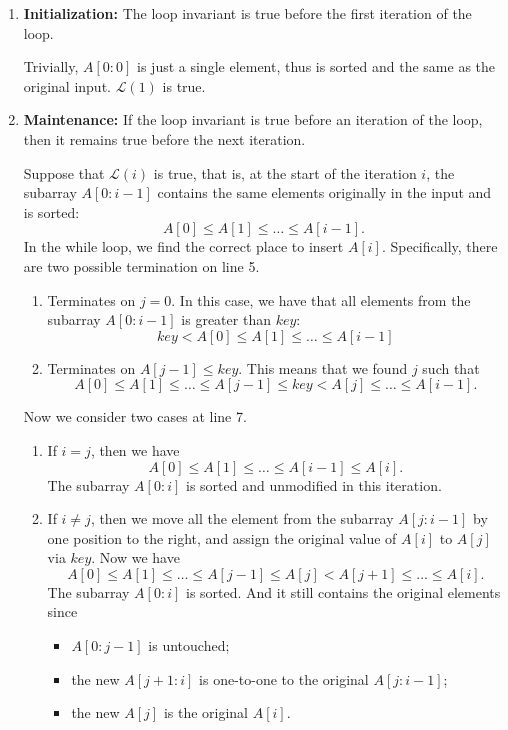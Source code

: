 \documentclass[12pt]{article}
\begin{document}
\begin{enumerate}
    \item \textbf{Initialization:} The loop invariant is true before the first iteration of the loop.

    Trivially, \(A[0 : 0]\) is just a single element, thus is sorted and the same as the original input. \(\mathcal{L}(1)\) is true.

    \item \textbf{Maintenance:} If the loop invariant is true before an iteration of the loop, then it remains true before the next iteration.

    Suppose that \(\mathcal{L}(i)\) is true, that is, at the start of the iteration \(i\), the subarray \(A[0 : i-1]\) contains the same elements originally in the input and is sorted:
    \[
        A[0] \leq A[1] \leq \dots \leq A[i-1].
    \]
    In the while loop, we find the correct place to insert \(A[i]\). Specifically, there are two possible termination on line 5.
    \begin{enumerate}
        \item Terminates on \(j = 0\). In this case, we have that all elements from the subarray \(A[0 : i - 1]\) is greater than \(key\):
        \[
            key < A[0] \leq A[1] \leq \dots \leq A[i-1]
        \]

        \item Terminates on \(A[j - 1] \leq key\). This means that we found \(j\) such that
        \[
            A[0] \leq A[1] \leq \dots \leq A[j-1] \leq key < A[j] \leq \dots \leq A[i-1].
        \]
    \end{enumerate}

    Now we consider two cases at line 7.
    \begin{enumerate}
        \item If \(i = j\), then we have
        \[
            A[0] \leq A[1] \leq \dots \leq A[i-1] \leq A[i].
        \]
        The subarray \(A[0 : i]\) is sorted and unmodified in this iteration.

        \item If \(i \neq j\), then we move all the element from the subarray \(A[j : i-1]\) by one position to the right, and assign the original value of \(A[i]\) to \(A[j]\) via \(key\). Now we have
        \[
            A[0] \leq A[1] \leq \dots \leq A[j-1] \leq A[j] < A[j+1] \leq \dots \leq A[i].
        \]
        The subarray \(A[0 : i]\) is sorted. And it still contains the original elements since
        \begin{itemize}
            \item \(A[0 : j-1]\) is untouched;
            \item the new \(A[j+1 : i]\) is one-to-one to the original \(A[j : i-1]\);
            \item the new \(A[j]\) is the original \(A[i]\).
        \end{itemize}
    \end{enumerate}


\end{enumerate}
\end{document}
